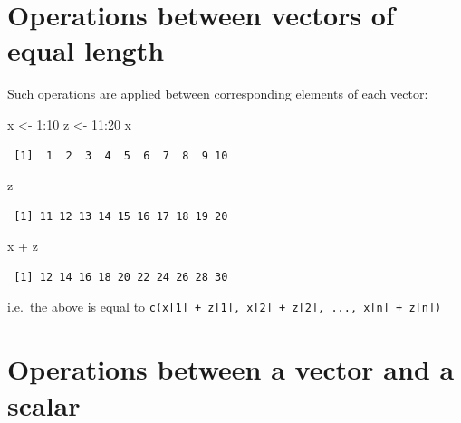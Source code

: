 \documentclass[
]{book}
\newenvironment{Shaded}{\begin{snugshade}}{\end{snugshade}}
\newcommand{\DecValTok}[1]{\textcolor[rgb]{0.00,0.00,0.81}{#1}}
\newcommand{\NormalTok}[1]{#1}
\newcommand{\OtherTok}[1]{\textcolor[rgb]{0.56,0.35,0.01}{#1}}
\newcommand{\SpecialCharTok}[1]{\textcolor[rgb]{0.00,0.00,0.00}{#1}}
\begin{document}
\hypertarget{operations-between-vectors-of-equal-length}{%
\section{Operations between vectors of equal length}\label{operations-between-vectors-of-equal-length}}

Such operations are applied between corresponding elements of each vector:

\begin{Shaded}
\begin{Highlighting}[]
\NormalTok{x }\OtherTok{\textless{}{-}} \DecValTok{1}\SpecialCharTok{:}\DecValTok{10}
\NormalTok{z }\OtherTok{\textless{}{-}} \DecValTok{11}\SpecialCharTok{:}\DecValTok{20}
\NormalTok{x}
\end{Highlighting}
\end{Shaded}

\begin{verbatim}
 [1]  1  2  3  4  5  6  7  8  9 10
\end{verbatim}

\begin{Shaded}
\begin{Highlighting}[]
\NormalTok{z}
\end{Highlighting}
\end{Shaded}

\begin{verbatim}
 [1] 11 12 13 14 15 16 17 18 19 20
\end{verbatim}

\begin{Shaded}
\begin{Highlighting}[]
\NormalTok{x }\SpecialCharTok{+}\NormalTok{ z}
\end{Highlighting}
\end{Shaded}

\begin{verbatim}
 [1] 12 14 16 18 20 22 24 26 28 30
\end{verbatim}

i.e.~the above is equal to \texttt{c(x{[}1{]}\ +\ z{[}1{]},\ x{[}2{]}\ +\ z{[}2{]},\ ...,\ x{[}n{]}\ +\ z{[}n{]})}

\hypertarget{operations-between-a-vector-and-a-scalar}{%
\section{Operations between a vector and a scalar}\label{operations-between-a-vector-and-a-scalar}}
\end{document}
